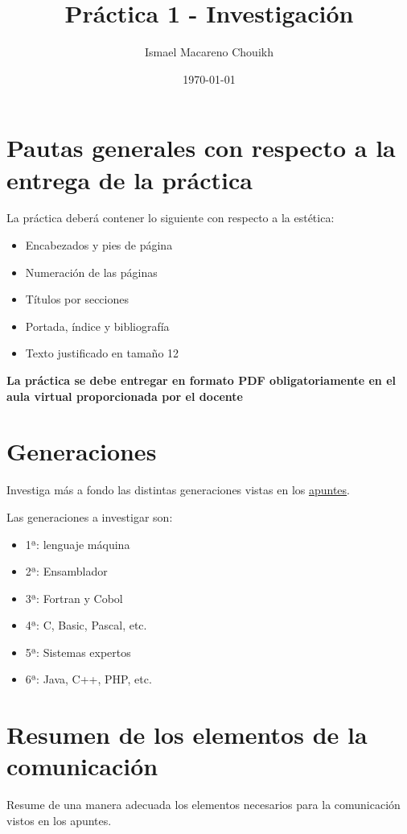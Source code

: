 \documentclass[11pt]{article}
\author{Ismael Macareno Chouikh}
\date{\today}
\title{Práctica 1 - Investigación}
\newcommand\blankpage{\null\thispagestyle{empty}\newpage}
\begin{document}
\maketitle
\tableofcontents

\blankpage

\section{Pautas generales con respecto a la entrega de la práctica}
\label{sec:org5efc898}
La práctica deberá contener lo siguiente con respecto a la estética:
\begin{itemize}
\item Encabezados y pies de página
\item Numeración de las páginas
\item Títulos por secciones
\item Portada, índice y bibliografía
\item Texto justificado en tamaño 12
\end{itemize}

\textbf{La práctica se debe entregar en formato PDF obligatoriamente en el aula virtual proporcionada por el docente}  
\section{Generaciones}
\label{sec:org702e6e2}
Investiga más a fondo las distintas generaciones vistas en los \href{https://clasesmaca.gnomio.com/pluginfile.php/29/mod\_resource/content/1/APUNTES\%20RL\%20TEMA\%201.pdf}{apuntes}.

Las generaciones a investigar son:
\begin{itemize}
\item 1ª: lenguaje máquina
\item 2ª: Ensamblador
\item 3ª: Fortran y Cobol
\item 4ª: C, Basic, Pascal, etc.
\item 5ª: Sistemas expertos
\item 6ª: Java, C++, PHP, etc.
\end{itemize}

\section{Resumen de los elementos de la comunicación}
\label{sec:org3ce9178}
Resume de una manera adecuada los elementos necesarios para la comunicación vistos en los apuntes.
\end{document}
